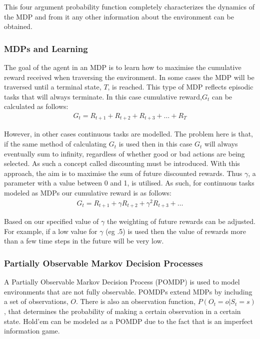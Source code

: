 This four argument probability function completely characterizes the dynamics of the MDP and from it any other
information about the environment can be obtained\citep{sutton1998reinforcement}.

\subsubsection{MDPs and Learning}
The goal of the agent in an MDP is to learn how to maximise the cumulative reward received when traversing
the environment.
In some cases the MDP will be traversed until a terminal state, $T$, is reached.
This type of MDP reflects episodic tasks that will always terminate.
In this case cumulative reward,$G_t$ can be calculated as follows:
\begin{align}
    G_t = R_{t+1}+R_{t+2}+R_{t+3}+\dots+R_T
\end{align}

However, in other cases continuous tasks are modelled.
The problem here is that, if the same method of calculating $G_t$ is used then in this case $G_t$
will always eventually sum to infinity, regardless of whether good or bad actions are being selected.
As such a concept called discounting must be introduced.
With this approach, the aim is to maximise the sum of future discounted rewards.
Thus $\gamma$, a parameter with a value between 0 and 1, is utilised.
As such, for continuous tasks modeled as MDPs our cumulative reward is as follows:
\begin{align}
    G_t = R_{t+1}+\gamma R_{t+2}+\gamma^{2}R_{t+3}+\dots
\end{align}

Based on our specified value of $\gamma$ the weighting of future rewards can be adjusted.
For example, if a low value for $\gamma$ (eg .5) is used then the value of rewards more than a
few time steps in the future will be very low.

\subsubsection{Partially Observable Markov Decision Processes}
A Partially Observable Markov Decision Process (POMDP) is used to model environments that are not
fully observable\citep{kaelbling1996reinforcement}.
POMDPs extend MDPs by including a set of observations, $O$.
There is also an observation function, $P(O_t=o|S_t=s)$, that determines the probability of making a certain observation
in a certain state.
Hold'em can be modeled as a POMDP due to the fact that is an imperfect information game.

